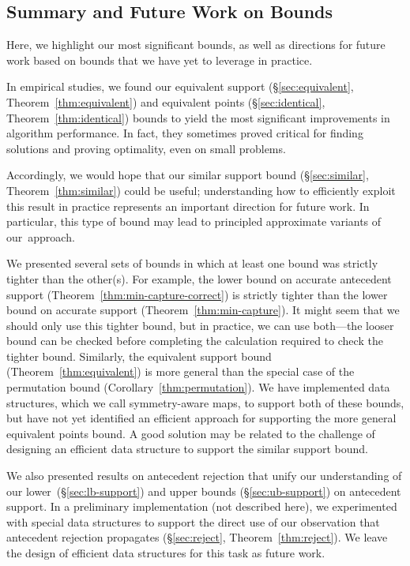 \begin{arxiv}

\section{Summary and Future Work on Bounds}
\label{sec:practical}

Here, we highlight our most significant bounds, as well as directions for future work
based on bounds that we have yet to leverage in practice.

In empirical studies, we found our equivalent support (\S\ref{sec:equivalent}, Theorem~\ref{thm:equivalent})
and equivalent points (\S\ref{sec:identical}, Theorem~\ref{thm:identical}) bounds
to yield the most significant improvements in algorithm performance.
%
In fact, they sometimes proved critical for finding solutions and proving optimality,
even on small problems.

Accordingly, we would hope that our similar support bound (\S\ref{sec:similar}, Theorem~\ref{thm:similar}) could be useful;
%
understanding how to efficiently exploit this result in practice
represents an important direction for future work. In particular, this type of bound may lead to
principled approximate variants of our~approach.

We presented several sets of bounds in which at least one bound was strictly tighter than the other(s).
%
For example, the lower bound on accurate antecedent support (Theorem~\ref{thm:min-capture-correct})
is strictly tighter than the lower bound on accurate support (Theorem~\ref{thm:min-capture}).
%
It might seem that we should only use this tighter bound, but in practice, we can use
both---the looser bound can be checked before completing the calculation required to
check the tighter bound.
%
Similarly, the equivalent support bound (Theorem~\ref{thm:equivalent})
is more general than the special case of the permutation bound (Corollary~\ref{thm:permutation}).
%
We have implemented data structures, which we call symmetry-aware maps,
to support both of these bounds, but have not yet identified an efficient approach
for supporting the more general equivalent points bound.
%
A good solution may be related to the challenge of designing an efficient data structure
to support the similar support bound.

We also presented results on antecedent rejection
that unify our understanding of our lower~(\S\ref{sec:lb-support})
and upper bounds (\S\ref{sec:ub-support}) on antecedent support.
%
In a preliminary implementation (not described here), we experimented with special data structures
to support the direct use of our observation that antecedent rejection propagates
(\S\ref{sec:reject}, Theorem~\ref{thm:reject}).
%
We leave the design of efficient data structures for this task as future work.


\end{arxiv}
